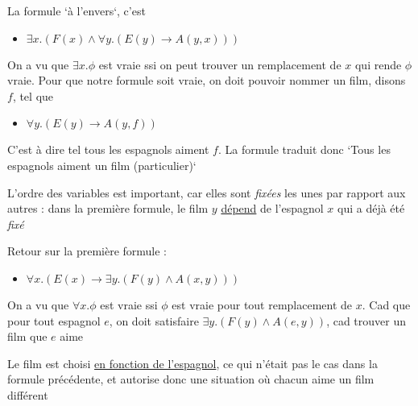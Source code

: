 \begin{frame}

La formule `à l'envers`, c'est 
\begin{itemize}
\item[] $\exists x. (F(x) \wedge \forall y. (E(y) \rightarrow A(y,x)))$\pause
\end{itemize}


On a vu que $\exists x. \phi$ est vraie ssi on peut trouver un remplacement de $x$ qui rende $\phi$ vraie. \pause Pour que notre formule soit vraie, on doit pouvoir nommer un film, disons $f$, tel que 

\begin{itemize}
\item[] $\forall y. (E(y) \rightarrow A(y,f))$
\end{itemize} 

C'est à dire tel tous les espagnols aiment $f$. \pause La formule traduit donc `Tous les espagnols aiment un film (particulier)`

\end{frame}
	
	
\begin{frame}


L'ordre des variables est important, car elles sont \textit{fixées} les unes par rapport aux autres \pause : dans la première formule, le film $y$ \underline{dépend} de l'espagnol $x$ qui a déjà été \textit{fixé}\pause\newline

Retour sur la première formule :
\begin{itemize}
\item[] $\forall x. (E(x) \rightarrow \exists y. (F(y) \wedge A(x,y)))$\pause
\end{itemize}

On a vu que $\forall x. \phi$ est vraie ssi $\phi$ est vraie pour tout remplacement de $x$. \pause Cad que pour tout espagnol $e$, on doit satisfaire $\exists y. (F(y) \wedge A(e,y))$, cad trouver un film que \textbf{\underline{$e$}} aime\pause\newline

Le film est choisi \underline{en fonction de l'espagnol}, ce qui n'était pas le cas dans la formule précédente, et autorise donc une situation où chacun aime un film différent


\end{frame}



